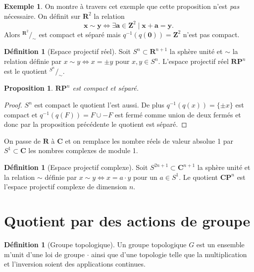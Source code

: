 \documentclass[12pt]{book}
\newtheorem{prop}[lemma]{Proposition}
\theoremstyle{definition}
\newtheorem{definition}[lemma]{Définition}
\newtheorem{example}[lemma]{Exemple}
\theoremstyle{remark}
\newcommand*\quot[2]{{^{\textstyle #1}\big/_{\textstyle #2}}}
\begin{document}
	\begin{example} On montre à travers cet exemple que cette proposition n'est \emph{pas} nécessaire. On définit sur $\mathbf{R}^2$ la relation  \[
		\textbf{x} \sim \textbf{y} \iff \exists \textbf{a} \in \mathbf{Z}^2 \;|\; \textbf{x} + \textbf{a} = \textbf{y}
	.\] Alors $\quot{\mathbf{R}^2}{\sim}$ est compact et séparé mais $q^{-1}(q(\textbf{0})) = \mathbf{Z}^2$ n'est pas compact.
	\end{example}

	\begin{definition}[Espace projectif réel]
		Soit $S^n \subset \mathbf{R}^{n+1}$ la sphère unité et $\sim$ la relation définie par $x \sim y \iff x = \pm y$ pour $x,y \in S^n$. L'espace projectif réel $\mathbf{RP}^n$ est le quotient  $\quot{S^n}{\sim}$.
	\end{definition}
	\begin{prop}
		$\mathbf{RP}^n$ est compact et séparé.
	\end{prop}
	\begin{proof}
		$S^n$ est compact le quotient l'est aussi. De plus $q^{-1}(q(x)) = \{\pm x\}$ est compact et $q^{-1}(q(F)) = F \cup -F$ est fermé comme union de deux fermés et donc par la proposition précédente le quotient est séparé.
	\end{proof}
	On passe de $\mathbf{R}$ à  $\mathbf{C}$ et on remplace les nombre réels de valeur absolue 1 par  $S^1 \subset \mathbf{C}$ les nombres complexes de module 1.

	\begin{definition}[Espace projectif complexe]
		Soit $S^{2n+1} \subset \mathbf{C}^{n+1}$ la sphère unité et la relation $\sim$ définie par  $x \sim y  \iff x = a\cdot y$ pour un $a \in S^1$. Le quotient $\mathbf{CP}^n$ est l'espace projectif complexe de dimension  $n$.
	\end{definition}

	\section{Quotient par des actions de groupe}

	\begin{definition}[Groupe topologique]
		Un groupe topologique $G$ est un ensemble m'unit d'une loi de groupe $\cdot$ ainsi que d'une topologie telle que la multiplication et l'inversion soient des applications continues. 
	\end{definition}
\end{document}
